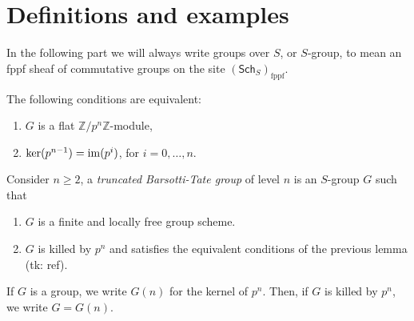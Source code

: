 \documentclass[../Main]{subfiles}
\begin{document}
\section{Definitions and examples}
In the following part we will always write groups over $S$, or $S$-group, to mean
an fppf sheaf of commutative groups on the site $(\mathsf{Sch}_{ S })_{\mathrm{fppf}}$.
\begin{lem}
	The following conditions are equivalent:
\begin{enumerate}
	\item $G$ is a flat $\mathbb{Z}/p^n\mathbb{Z}$-module,

	\item $\ker(p^{n-1}) = \operatorname{im} (p^i)$, for $i=0, \ldots, n$.
\end{enumerate}
\end{lem} 


\begin{defn}
	Consider $n \geq 2$, a {\em truncated Barsotti-Tate group} of level $n$
	is an $S$-group $G$ such that
\begin{enumerate}
	\item $G$ is a finite and locally free group scheme.
	\item $G$ is killed by $p^n$ and satisfies the equivalent conditions of the previous lemma (tk: ref).
\end{enumerate}
\end{defn}


\begin{defn}[]
	If $G$ is a group, we write $G(n)$ for the kernel of $p^n$.
	Then, if $G$ is killed by $p^n$, we write $G = G(n)$.
\end{defn}
\end{document}
